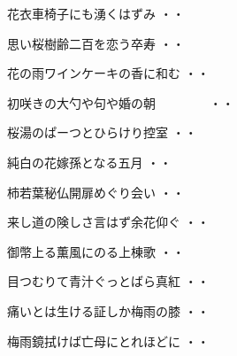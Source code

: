 \begin{shiika}花衣車椅子にも湧くはずみ
\hfill{・・}\end{shiika}

\begin{shiika}思い桜樹齢二百を恋う卒寿
\hfill{・・}\end{shiika}

\begin{shiika}花の雨ワインケーキの香に和む
\hfill{・・}\end{shiika}

\begin{shiika}初咲きの大勺や句や婚の朝　　　　
\hfill{・・}\end{shiika}

\begin{shiika}桜湯のぱーつとひらけり控室
\hfill{・・}\end{shiika}

\begin{shiika}純白の花嫁孫となる五月
\hfill{・・}\end{shiika}

\begin{shiika}柿若葉秘仏開扉めぐり会い
\hfill{・・}\end{shiika}

\begin{shiika}来し道の険しさ言はず余花仰ぐ
\hfill{・・}\end{shiika}

\begin{shiika}御幣上る薫風にのる上棟歌
\hfill{・・}\end{shiika}

\begin{shiika}目つむりて青汁ぐっとばら真紅
\hfill{・・}\end{shiika}

\begin{shiika}痛いとは生ける証しか梅雨の膝
\hfill{・・}\end{shiika}

\begin{shiika}梅雨鏡拭けば亡母にとれほどに
\hfill{・・}\end{shiika}

